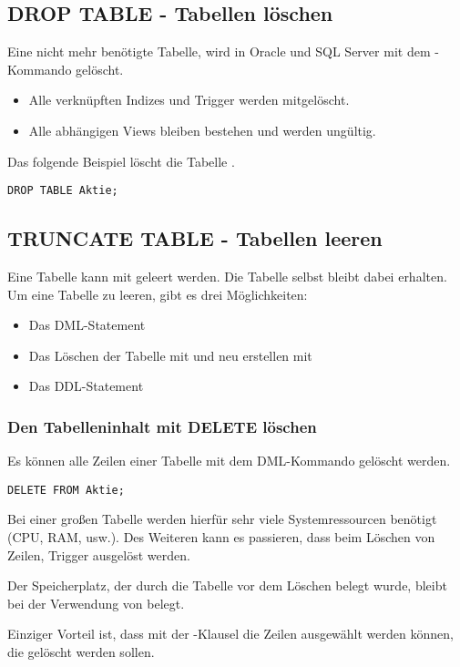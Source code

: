 \subsection{DROP TABLE - Tabellen löschen}
Eine nicht mehr benötigte Tabelle, wird in Oracle und SQL Server mit dem -Kommando gelöscht.
\begin{itemize}
    \item Alle verknüpften Indizes und Trigger werden mitgelöscht.
    \item Alle abhängigen Views bleiben bestehen und werden ungültig.
\end{itemize}
Das folgende Beispiel löscht die Tabelle .
\begin{lstlisting}[language=oracle_sql,caption={Eine Tabelle löschen},label=sql08_21]
DROP TABLE Aktie;
        \end{lstlisting}
\subsection{TRUNCATE TABLE - Tabellen leeren}
Eine Tabelle kann mit  geleert werden. Die Tabelle selbst bleibt dabei erhalten. Um eine Tabelle zu leeren, gibt es drei Möglichkeiten:
\begin{itemize}
    \item Das DML-Statement 
    \item Das Löschen der Tabelle mit  und neu erstellen mit 
    \item Das DDL-Statement 
\end{itemize}
\subsubsection{Den Tabelleninhalt mit DELETE löschen}
Es können alle Zeilen einer Tabelle mit dem DML-Kommando  gelöscht werden.
\begin{lstlisting}[language=oracle_sql,caption={Zeilen mit DELETE löschen},label=sql08_22]
DELETE FROM Aktie;
          \end{lstlisting}
Bei einer großen Tabelle werden hierfür sehr viele
Systemressourcen benötigt (CPU, RAM, usw.). Des Weiteren kann es
passieren, dass beim Löschen von Zeilen, Trigger ausgelöst werden.

\begin{merke}
    Der Speicherplatz, der durch die Tabelle vor dem Löschen belegt
    wurde, bleibt bei der Verwendung von  belegt.
\end{merke}
Einziger Vorteil ist, dass mit der -Klausel die
Zeilen ausgewählt werden können, die gelöscht werden sollen.
